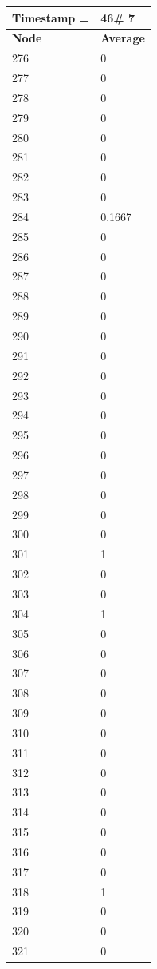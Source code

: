 \begin{tabular}{|l||l|}
\hline
\textbf{Timestamp =} & \textbf{46}\# 7\\\hline
	\textbf{Node} & \textbf{Average} \\ \hline
\hline
	276 & 0 \\ \hline
	277 & 0 \\ \hline
	278 & 0 \\ \hline
	279 & 0 \\ \hline
	280 & 0 \\ \hline
	281 & 0 \\ \hline
	282 & 0 \\ \hline
	283 & 0 \\ \hline
	284 & 0.1667 \\ \hline
	285 & 0 \\ \hline
	286 & 0 \\ \hline
	287 & 0 \\ \hline
	288 & 0 \\ \hline
	289 & 0 \\ \hline
	290 & 0 \\ \hline
	291 & 0 \\ \hline
	292 & 0 \\ \hline
	293 & 0 \\ \hline
	294 & 0 \\ \hline
	295 & 0 \\ \hline
	296 & 0 \\ \hline
	297 & 0 \\ \hline
	298 & 0 \\ \hline
	299 & 0 \\ \hline
	300 & 0 \\ \hline
	301 & 1 \\ \hline
	302 & 0 \\ \hline
	303 & 0 \\ \hline
	304 & 1 \\ \hline
	305 & 0 \\ \hline
	306 & 0 \\ \hline
	307 & 0 \\ \hline
	308 & 0 \\ \hline
	309 & 0 \\ \hline
	310 & 0 \\ \hline
	311 & 0 \\ \hline
	312 & 0 \\ \hline
	313 & 0 \\ \hline
	314 & 0 \\ \hline
	315 & 0 \\ \hline
	316 & 0 \\ \hline
	317 & 0 \\ \hline
	318 & 1 \\ \hline
	319 & 0 \\ \hline
	320 & 0 \\ \hline
	321 & 0 \\ \hline
\end{tabular}
